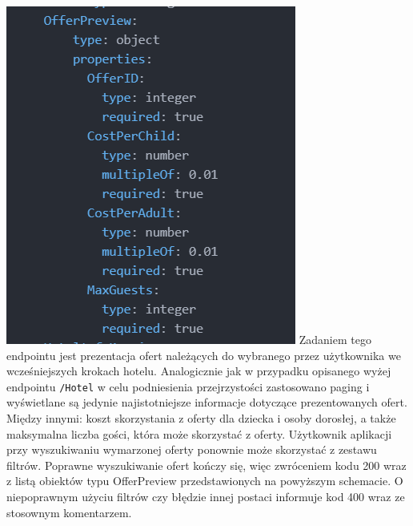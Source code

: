 \documentclass{article}
\begin{document}
\includegraphics[width=\linewidth]{Oferta+Hotel-Raml/OfferPreview_Raml.png}
Zadaniem tego endpointu jest prezentacja ofert należących do wybranego przez użytkownika we wcześniejszych krokach hotelu. Analogicznie jak w przypadku opisanego wyżej endpointu \texttt{/Hotel} w celu podniesienia przejrzystości zastosowano paging i wyświetlane są jedynie najistotniejsze informacje dotyczące prezentowanych ofert. Między innymi: koszt skorzystania z oferty dla dziecka i osoby dorosłej, a także maksymalna liczba gości, która może skorzystać z oferty. Użytkownik aplikacji przy wyszukiwaniu wymarzonej oferty ponownie może skorzystać z zestawu filtrów. Poprawne wyszukiwanie ofert kończy się, więc zwróceniem kodu 200 wraz z listą obiektów typu OfferPreview przedstawionych na powyższym schemacie. O niepoprawnym użyciu filtrów czy błędzie innej postaci informuje kod 400 wraz ze stosownym komentarzem.
\end{document}
